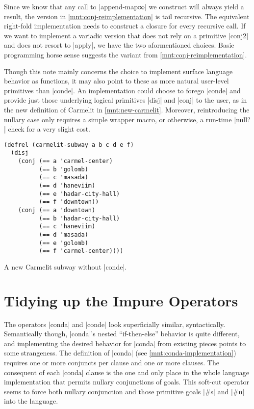 \documentclass[sigplan,screen,draft,anonymous,review,natbib=false]{acmart}
\begin{document}
Since we know that any call to \rackinline|append-map∞| we construct
will always yield a result, the version in
\cref{mnt:conj-reimplementation} is tail recursive. The equivalent
right-fold implementation needs to construct a closure for every
recursive call. If we want to implement a variadic version that does
not rely on a primitive \rackinline|conj2| and does not resort to
\rackinline|apply|, we have the two aformentioned choices. Basic
programming horse sense suggests the variant from
\cref{mnt:conj-reimplementation}.

Though this note mainly concerns the choice to implement surface
language behavior as functions, it may also point to these as more
natural user-level primitives than \rackinline|conde|. An
implementation could choose to forego \rackinline|conde| and provide
just those underlying logical primitives \rackinline|disj| and
\rackinline|conj| to the user, as in the new definition of Carmelit in
\cref{mnt:new-carmelit}. Moreover, reintroducing the nullary case only
requires a simple wrapper macro, or otherwise, a run-time
\rackinline|null?| check for a very slight cost.

\begin{listing}
  \begin{verbatim}
(defrel (carmelit-subway a b c d e f)
  (disj
    (conj (== a 'carmel-center)
          (== b 'golomb)
          (== c 'masada)
          (== d 'haneviim)
          (== e 'hadar-city-hall)
          (== f 'downtown))
    (conj (== a 'downtown)
          (== b 'hadar-city-hall)
          (== c 'haneviim)
          (== d 'masada)
          (== e 'golomb)
          (== f 'carmel-center))))
  \end{verbatim}
  \caption{A new Carmelit subway without \rackinline|conde|.}
  \label{mnt:new-carmelit}
\end{listing}

\section{Tidying up the Impure Operators}\label{sec:impure}

The operators \rackinline|conda| and \rackinline|conde| look
superficially similar, syntactically. Semantically though,
\rackinline|conda|'s nested \enquote{if-then-else} behavior is quite
different, and implementing the desired behavior for
\rackinline|conda| from existing pieces points to some strangeness.
The definition of \rackinline|conda| (see
\cref{mnt:conda-implementation}) requires one or more conjuncts per
clause and one or more clauses. The consequent of each
\rackinline|conda| clause is the one and only place in the whole
language implementation that permits nullary conjunctions of goals.
This soft-cut operator seems to force both nullary conjunction and
those primitive goals \rackinline|#s| and \rackinline|#u| into the
language.
\end{document}
